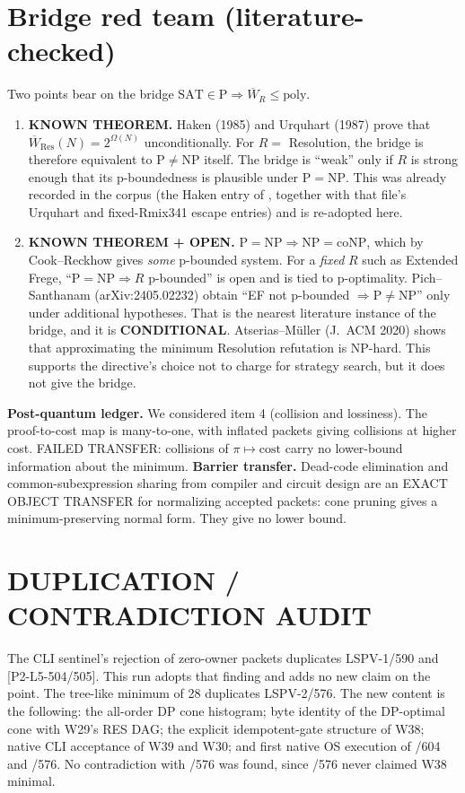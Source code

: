 \documentclass[11pt]{article}
\begin{document}
\section{Bridge red team (literature-checked)}
Two points bear on the bridge $\mathrm{SAT}\in\mathrm P\Rightarrow\overline W_R\le\mathrm{poly}$.
\begin{enumerate}
\item \textbf{KNOWN THEOREM.} Haken (1985) and Urquhart (1987) prove that
$\overline W_{\mathrm{Res}}(N)=2^{\Omega(N)}$ unconditionally.
For $R=$ Resolution, the bridge is therefore equivalent to $\mathrm{P}\ne\mathrm{NP}$
itself. The bridge is ``weak'' only if $R$ is strong enough that its p-boundedness is
plausible under $\mathrm P=\mathrm{NP}$. This was already recorded in the corpus
(the Haken entry of ,
together with that file's Urquhart and fixed-Rmix341 escape entries) and is re-adopted here.
\item \textbf{KNOWN THEOREM + OPEN.} $\mathrm P=\mathrm{NP}\Rightarrow
\mathrm{NP}=\mathrm{coNP}$, which by Cook--Reckhow gives \emph{some} p-bounded system.
For a \emph{fixed} $R$ such as Extended Frege, ``$\mathrm P=\mathrm{NP}\Rightarrow R$
p-bounded'' is open and is tied to p-optimality.
Pich--Santhanam (arXiv:2405.02232) obtain ``EF not p-bounded $\Rightarrow\mathrm P\ne
\mathrm{NP}$'' only under additional hypotheses. That is the nearest literature instance
of the bridge, and it is \textbf{CONDITIONAL}.
Atserias--M\"uller (J.~ACM 2020) shows that approximating the minimum Resolution
refutation is NP-hard. This supports the directive's choice not to charge for
strategy search, but it does not give the bridge.
\end{enumerate}
\textbf{Post-quantum ledger.} We considered item 4 (collision and lossiness). The
proof-to-cost map is many-to-one, with inflated packets giving collisions at higher cost.
FAILED TRANSFER: collisions of $\pi\mapsto\mathrm{cost}$ carry no lower-bound information
about the minimum. \textbf{Barrier transfer.} Dead-code elimination and common-subexpression
sharing from compiler and circuit design are an EXACT OBJECT TRANSFER for normalizing
accepted packets: cone pruning gives a minimum-preserving normal form. They give no lower bound.

\section{DUPLICATION / CONTRADICTION AUDIT}
The CLI sentinel's rejection of zero-owner packets duplicates LSPV-1/590 and
[P2-L5-504/505]. This run adopts that finding and adds no new claim on the point.
The tree-like minimum of 28 duplicates LSPV-2/576. The new content is the following:
the all-order DP cone histogram; byte identity of the DP-optimal cone with W29's RES DAG;
the explicit idempotent-gate structure of W38; native CLI acceptance of W39 and W30; and
first native OS execution of /604 and /576. No contradiction with /576 was found, since
/576 never claimed W38 minimal.
\end{document}
